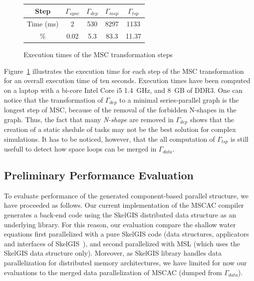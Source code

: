 \begin{figure}[!h]
 \begin{center}
 \begin{tabular}{|c|c|c|c|c|}
  \hline
   Step & $\Gamma_{sync}$ & $\Gamma_{dep}$ & $\Gamma_{msp}$ & $\Gamma_{tsp}$\\
   \hline
   Time (ms) & 2 & 530 & 8297 & 1133\\
   \hline
   \% & 0.02 & 5.3 & 83.3 & 11.37\\
   \hline
 \end{tabular}
\caption{Execution times of the MSC transformation steps}
\label{fig:exectime}
 \end{center}
\end{figure}

Figure~\ref{fig:exectime} illustrates the execution time for each step of the MSC transformation for an overall execution time of ten seconds. Execution times have been computed on a laptop with a bi-core Intel Core i5 1.4~GHz, and 8~GB of DDR3. 
One can notice that the transformation of $\Gamma_{dep}$ to a minimal series-parallel graph is the longest step of MSC, because of the removal of the forbidden N-shapes in the graph. %
Thus, the fact that many \emph{N-shape} are removed in $\Gamma_{dep}$ shows that the creation of a static shedule of tasks may not be the best solution for complex simulations. It has to be noticed, however, that the all computation of $\Gamma_{tsp}$ is still usefull to detect how space loops can be merged in $\Gamma_{data}$.

\subsection{Preliminary Performance Evaluation}
To evaluate performance of the generated component-based parallel structure, we have proceeded as follows. Our current implementation of the MSCAC compiler generates a back-end code using the SkelGIS distributed data structure as an underlying library. For this reason, our evaluation compare the shallow water equations first parallelized with a pure SkelGIS code (data structures, applicators and interfaces of SkelGIS~\cite{CPE:CPE3494}), and second parallelized with MSL (which uses the SkelGIS data structure only). Moreover, as SkelGIS library handles data parallelization for distributed memory architectures, we have limited for now our evaluations to the merged data parallelization of MSCAC (dumped from $\Gamma_{data}$). 

